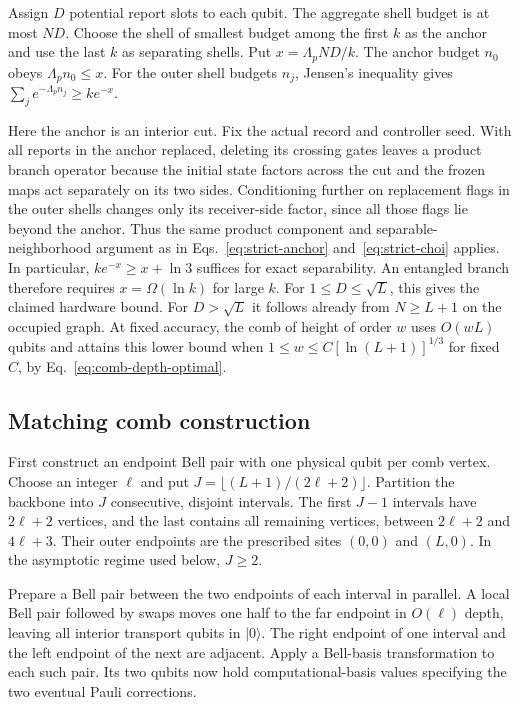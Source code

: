 \documentclass[aps,prl,twocolumn,superscriptaddress,longbibliography,reprint,floatfix]{revtex4-2}
\begin{document}
Assign $D$ potential report slots to each qubit. The aggregate shell
budget is at most $ND$. Choose the shell of smallest budget among the
first $k$ as the anchor and use the last $k$ as separating shells.
Put $x=\Lambda_p ND/k$. The anchor budget $n_0$ obeys
$\Lambda_p n_0\le x$. For the outer shell budgets $n_j$, Jensen's
inequality gives $\sum_j e^{-\Lambda_p n_j}\ge k e^{-x}$.

Here the anchor is an interior cut. Fix the actual record and controller
seed. With all reports in the anchor replaced, deleting its crossing
gates leaves a product branch operator because the initial state factors
across the cut and the frozen maps act separately on its two sides. Conditioning
further on replacement flags in the outer shells changes only its
receiver-side factor, since all those flags lie beyond the anchor.
Thus the same product component and separable-neighborhood argument as in
Eqs.~\eqref{eq:strict-anchor} and~\eqref{eq:strict-choi} applies.
In particular, $k e^{-x}\ge x+\ln3$ suffices for exact separability.
An entangled branch therefore requires $x=\Omega(\ln k)$ for large $k$.
For $1\le D\le\sqrt L$, this gives the claimed hardware bound. For
$D>\sqrt L$ it follows already from $N\ge L+1$ on the occupied graph.
At fixed accuracy, the comb of height of order $w$ uses $O(wL)$ qubits
and attains this lower bound when $1\le w\le C[\ln(L+1)]^{1/3}$ for
fixed $C$, by Eq.~\eqref{eq:comb-depth-optimal}.

\subsection{Matching comb construction}
\label{sec:comb-construction}

First construct an endpoint Bell pair with one physical qubit per
comb vertex.  Choose an integer $\ell$ and put
$J=\lfloor(L+1)/(2\ell+2)\rfloor$.
Partition the backbone into $J$ consecutive, disjoint intervals.
The first $J-1$ intervals have $2\ell+2$ vertices, and the last
contains all remaining vertices, between $2\ell+2$ and $4\ell+3$.
Their outer endpoints are the prescribed sites $(0,0)$ and $(L,0)$.
In the asymptotic regime used below, $J\ge2$.

Prepare a Bell pair between the two endpoints of each interval in
parallel.  A local Bell pair followed by swaps moves one half to
the far endpoint in $O(\ell)$ depth, leaving all interior transport
qubits in $|0\rangle$.
The right endpoint of one interval and the left endpoint of the next
are adjacent.  Apply a Bell-basis transformation to each such pair.
Its two qubits now hold computational-basis values specifying the
two eventual Pauli corrections.
\end{document}
